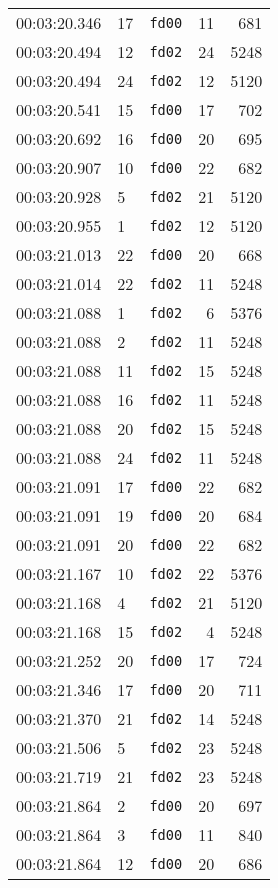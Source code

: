 \documentclass{article}
\begin{document}
\begin{longtable}{lllrr}
00:03:20.346 & 17 & \texttt{fd00} & 11 & 681 \\
00:03:20.494 & 12 & \texttt{fd02} & 24 & 5248 \\
00:03:20.494 & 24 & \texttt{fd02} & 12 & 5120 \\
00:03:20.541 & 15 & \texttt{fd00} & 17 & 702 \\
00:03:20.692 & 16 & \texttt{fd00} & 20 & 695 \\
00:03:20.907 & 10 & \texttt{fd00} & 22 & 682 \\
00:03:20.928 & 5 & \texttt{fd02} & 21 & 5120 \\
00:03:20.955 & 1 & \texttt{fd02} & 12 & 5120 \\
00:03:21.013 & 22 & \texttt{fd00} & 20 & 668 \\
00:03:21.014 & 22 & \texttt{fd02} & 11 & 5248 \\
00:03:21.088 & 1 & \texttt{fd02} & 6 & 5376 \\
00:03:21.088 & 2 & \texttt{fd02} & 11 & 5248 \\
00:03:21.088 & 11 & \texttt{fd02} & 15 & 5248 \\
00:03:21.088 & 16 & \texttt{fd02} & 11 & 5248 \\
00:03:21.088 & 20 & \texttt{fd02} & 15 & 5248 \\
00:03:21.088 & 24 & \texttt{fd02} & 11 & 5248 \\
00:03:21.091 & 17 & \texttt{fd00} & 22 & 682 \\
00:03:21.091 & 19 & \texttt{fd00} & 20 & 684 \\
00:03:21.091 & 20 & \texttt{fd00} & 22 & 682 \\
00:03:21.167 & 10 & \texttt{fd02} & 22 & 5376 \\
00:03:21.168 & 4 & \texttt{fd02} & 21 & 5120 \\
00:03:21.168 & 15 & \texttt{fd02} & 4 & 5248 \\
00:03:21.252 & 20 & \texttt{fd00} & 17 & 724 \\
00:03:21.346 & 17 & \texttt{fd00} & 20 & 711 \\
00:03:21.370 & 21 & \texttt{fd02} & 14 & 5248 \\
00:03:21.506 & 5 & \texttt{fd02} & 23 & 5248 \\
00:03:21.719 & 21 & \texttt{fd02} & 23 & 5248 \\
00:03:21.864 & 2 & \texttt{fd00} & 20 & 697 \\
00:03:21.864 & 3 & \texttt{fd00} & 11 & 840 \\
00:03:21.864 & 12 & \texttt{fd00} & 20 & 686 \\

\end{longtable}
\end{document}

